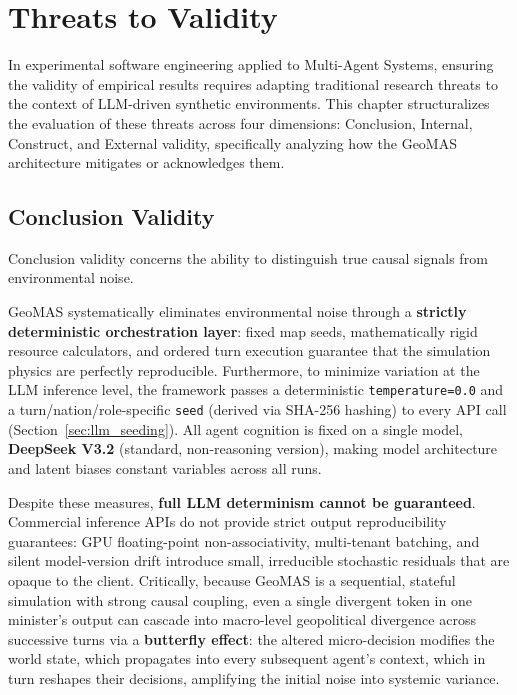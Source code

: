 \chapter{Threats to Validity}
\label{ch:threats_validity}

In experimental software engineering applied to Multi-Agent Systems, ensuring the validity of empirical results requires adapting traditional research threats to the context of LLM-driven synthetic environments. This chapter structuralizes the evaluation of these threats across four dimensions: Conclusion, Internal, Construct, and External validity, specifically analyzing how the GeoMAS architecture mitigates or acknowledges them.

\section{Conclusion Validity}
Conclusion validity concerns the ability to distinguish true causal signals from environmental noise. 

GeoMAS systematically eliminates environmental noise through a \textbf{strictly deterministic orchestration layer}: fixed map seeds, mathematically rigid resource calculators, and ordered turn execution guarantee that the simulation physics are perfectly reproducible. Furthermore, to minimize variation at the LLM inference level, the framework passes a deterministic \texttt{temperature=0.0} and a turn/nation/role-specific \texttt{seed} (derived via SHA-256 hashing) to every API call (Section~\ref{sec:llm_seeding}). All agent cognition is fixed on a single model, \textbf{DeepSeek V3.2} (standard, non-reasoning version), making model architecture and latent biases constant variables across all runs.

Despite these measures, \textbf{full LLM determinism cannot be guaranteed}. Commercial inference APIs do not provide strict output reproducibility guarantees: GPU floating-point non-associativity, multi-tenant batching, and silent model-version drift introduce small, irreducible stochastic residuals that are opaque to the client. Critically, because GeoMAS is a sequential, stateful simulation with strong causal coupling, even a single divergent token in one minister's output can cascade into macro-level geopolitical divergence across successive turns via a \textbf{butterfly effect}: the altered micro-decision modifies the world state, which propagates into every subsequent agent's context, which in turn reshapes their decisions, amplifying the initial noise into systemic variance.

